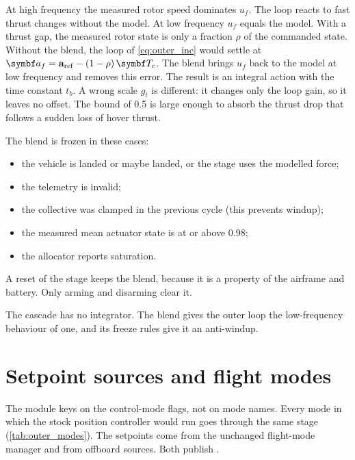 At high frequency the measured rotor speed dominates $u_f$.
The loop reacts to fast thrust changes without the model.
At low frequency $u_f$ equals the model.
With a thrust gap, the measured rotor state is only a fraction $\rho$ of the commanded state.
Without the blend, the loop of \cref{eq:outer_inc} would settle at $\vect a_f = \aref - (1-\rho)\,\vect T_c$.
The blend brings $u_f$ back to the model at low frequency and removes this error.
The result is an integral action with the time constant $t_b$.
A wrong scale $g_t$ is different: it changes only the loop gain, so it leaves no offset.
The bound of 0.5 is large enough to absorb the thrust drop that follows a sudden loss of hover thrust.

The blend is frozen in these cases:
\begin{itemize}
  \item the vehicle is landed or maybe landed, or the stage uses the modelled force;
  \item the telemetry is invalid;
  \item the collective was clamped in the previous cycle (this prevents windup);
  \item the measured mean actuator state is at or above 0.98;
  \item the allocator reports saturation.
\end{itemize}
A reset of the stage keeps the blend, because it is a property of the airframe and battery.
Only arming and disarming clear it.

\begin{keyresult}
The cascade has no integrator.
The blend gives the outer loop the low-frequency behaviour of one, and its freeze rules give it an anti-windup.
\end{keyresult}

\section{Setpoint sources and flight modes}\label{sec:outer_modes}

The module keys on the control-mode flags, not on mode names.
Every mode in which the stock position controller would run goes through the same stage (\cref{tab:outer_modes}).
The setpoints come from the unchanged flight-mode manager and from offboard sources.
Both publish .

